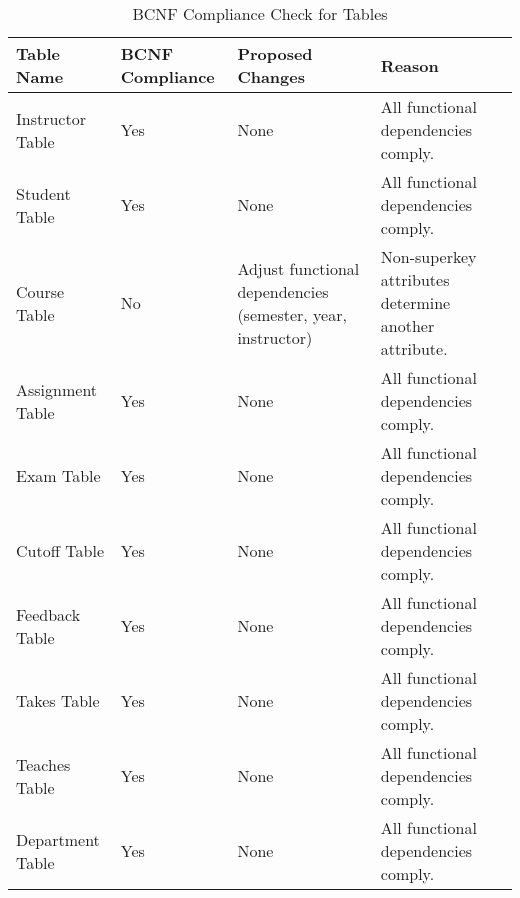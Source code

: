 \documentclass[12pt]{article}
\begin{document}
\begin{table}[ht]
    \centering
    \begin{tabularx}{\textwidth}{|X|X|X|X|}
        \hline
        \textbf{Table Name} & \textbf{BCNF Compliance} & \textbf{Proposed Changes} & \textbf{Reason} \\
        \hline
        Instructor Table & Yes & None & All functional dependencies comply. \\
        \hline
        Student Table & Yes & None & All functional dependencies comply. \\
        \hline
        Course Table & No & Adjust functional dependencies (semester, year, instructor) & Non-superkey attributes determine another attribute. \\
        \hline
        Assignment Table & Yes & None & All functional dependencies comply. \\
        \hline
        Exam Table & Yes & None & All functional dependencies comply. \\
        \hline
        Cutoff Table & Yes & None & All functional dependencies comply. \\
        \hline
        Feedback Table & Yes & None & All functional dependencies comply. \\
        \hline
        Takes Table & Yes & None & All functional dependencies comply. \\
        \hline
        Teaches Table & Yes & None & All functional dependencies comply. \\
        \hline
        Department Table & Yes & None & All functional dependencies comply. \\
        \hline
    \end{tabularx}
    \caption{BCNF Compliance Check for Tables}
    \label{tab:bcnf_compliance}
\end{table}
\end{document}
